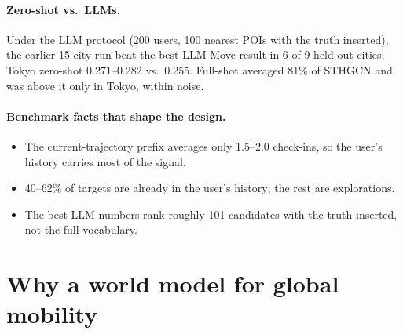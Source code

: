 \documentclass[10.5pt]{article}
\begin{document}
\paragraph{Zero-shot vs.\ LLMs.} Under the LLM protocol (200 users, 100 nearest POIs with the truth inserted), the
earlier 15-city run beat the best LLM-Move result in 6 of 9 held-out cities; Tokyo zero-shot 0.271--0.282 vs.\ 0.255.
Full-shot averaged 81\% of STHGCN and was above it only in Tokyo, within noise.

\paragraph{Benchmark facts that shape the design.}
\begin{itemize}
\item The current-trajectory prefix averages only 1.5--2.0 check-ins, so the user's history carries most of the signal.
\item 40--62\% of targets are already in the user's history; the rest are explorations.
\item The best LLM numbers rank roughly 101 candidates with the truth inserted, not the full vocabulary.
\end{itemize}

\section{Why a world model for global mobility}\label{sec:why}
\end{document}
